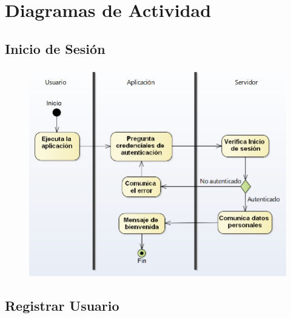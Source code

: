 
\section{Diagramas de Actividad}

	\subsection{Inicio de Sesión}
	\begin{figure}[H]
	\centering
		\includegraphics[width=1\textwidth]{imagenes/analisis/diagrama-actividad-inicioSesion.png}
		\label{fig:diagrama-actividad-autenticar}
	\end{figure}

	\subsection{Registrar Usuario}

